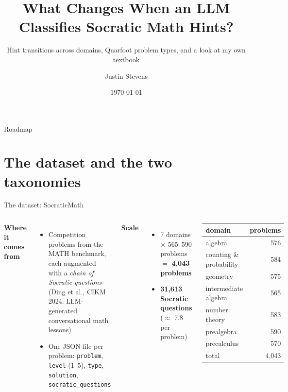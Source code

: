 \documentclass[10pt,aspectratio=169]{beamer}
\title[Claude classifications of Socratic hints]{What Changes When an LLM Classifies Socratic Math Hints?}
\subtitle{Hint transitions across domains, Quarfoot problem types, and a look at my own textbook}
\author{Justin Stevens}
\institute{Tea-time talk}
\date{\today}
\begin{document}
\begin{frame}
  \titlepage
\end{frame}

\begin{frame}{Roadmap}
  \tableofcontents
\end{frame}

\section{The dataset and the two taxonomies}

\begin{frame}{The dataset: SocraticMath}
  \begin{columns}[T]
    \textbf{Where it comes from}
    \begin{itemize}
      \item Competition problems from the MATH benchmark, each augmented with a
            \emph{chain of Socratic questions} (Ding et al., CIKM 2024:
            LLM-generated conversational math lessons)
      \item One JSON file per problem:
            \texttt{problem}, \texttt{level} (1--5), \texttt{type},
            \texttt{solution}, \texttt{socratic\_questions}
    \end{itemize}
    \medskip
    \textbf{Scale}
    \begin{itemize}
      \item 7 domains $\times$ 565--590 problems $=$ \textbf{4{,}043 problems}
      \item \textbf{31{,}613 Socratic questions} ($\approx$ 7.8 per problem)
    \end{itemize}
    \begin{center}
      \small
      \begin{tabular}{lr}
        \toprule
        domain & problems \\
        \midrule
        algebra & 576 \\
        counting \& probability & 584 \\
        geometry & 575 \\
        intermediate algebra & 565 \\
        number theory & 583 \\
        prealgebra & 590 \\
        precalculus & 570 \\
        \midrule
        total & 4{,}043 \\
        \bottomrule
      \end{tabular}
    \end{center}
  \end{columns}
\end{frame}
\end{document}
